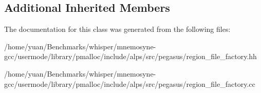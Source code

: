 \subsection*{Additional Inherited Members}


The documentation for this class was generated from the following files\+:\begin{DoxyCompactItemize}
\item 
/home/yuan/\+Benchmarks/whisper/mnemosyne-\/gcc/usermode/library/pmalloc/include/alps/src/pegasus/region\+\_\+file\+\_\+factory.\+hh\item 
/home/yuan/\+Benchmarks/whisper/mnemosyne-\/gcc/usermode/library/pmalloc/include/alps/src/pegasus/region\+\_\+file\+\_\+factory.\+cc\end{DoxyCompactItemize}
